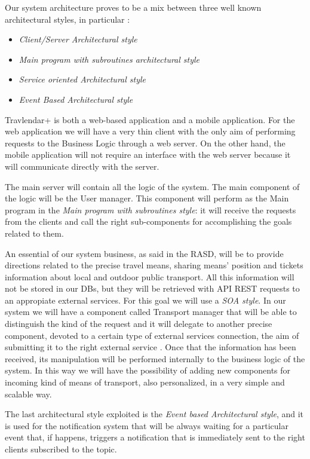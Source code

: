 Our system architecture proves to be a mix between three well known architectural styles, in particular : 

\begin{itemize}
\setlength{\leftskip}{0.5cm}
\item \emph{Client/Server Architectural style}
\item \emph{Main program with subroutines architectural style}
\item \emph{Service oriented Architectural style}
\item \emph{Event Based Architectural style}
\end{itemize}

Travlendar+ is both a web-based application and a mobile application. For the web application we will have a very thin client with the only aim of performing requests to the Business Logic through a web server.
On the other hand, the mobile application will not require an interface with the web server because it will communicate directly with the server.
\\\par
The main server will contain all the logic of the system. The main component of the logic will be the User manager. This component will perform as the Main program in the \emph{Main program with subroutines style}: it will receive the requests from the clients and call the right sub-components for accomplishing the goals related to them.
\\\par
An essential of our system business, as said in the RASD, will be to provide directions related to the precise travel means, sharing means’ position and tickets information about local and outdoor public transport. All this information will not be stored in our DBs, but they will be retrieved with API REST requests to an appropiate external services. For this goal we will use a \emph{SOA style}. 
In our system we will have a component called Transport manager that will be able to distinguish the kind of the request and it will delegate to another precise component, devoted to a certain type of external services connection, the aim of submitting it to the right external service . Once that the information has been received, its manipulation will be performed internally to the business logic of the system. In this way we will have the possibility of adding new components for incoming kind of means of transport, also personalized, in a very simple and scalable way.
\\\par
The last architectural style exploited is the \emph{Event based Architectural style}, and it is used for the notification system that will be always waiting for a particular event that, if happens, triggers a notification that is immediately sent to the right clients subscribed to the topic. 

